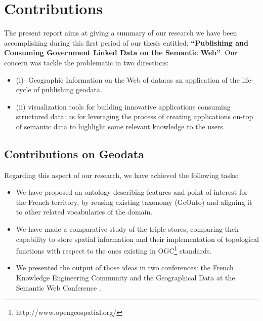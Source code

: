 \documentclass[a4paper,11pt]{report}
\begin{document}

\section{Contributions}
The present report aims at giving a summary of our research we have been accomplishing
during this first period of our thesis entitled: \textbf{``Publishing and Consuming Government Linked Data on the Semantic Web''}. Our concern was tackle the problematic in two directions: 
\begin{itemize}
\item (i)- Geographic Information on the Web of data:as an application of the life-cycle of publishing geodata.
\item (ii) visualization tools for building innovative applications consuming structured data: as for leveraging the process of creating applications on-top of semantic data to highlight some relevant knowledge to the users.

\end{itemize}

\subsection{Contributions on Geodata}
Regarding this aspect of our research, we have achieved the following tasks:
 \begin{itemize}
  \item We have proposed an ontology describing features and point of interest for the French territory, by reusing existing taxonomy (GeOnto) and aligning it to other related vocabularies of 
  the domain.
 \item We have made a comparative study of the triple stores, comparing their capability to store spatial information and their implementation of topological functions with respect to the ones 
existing in OGC\footnote{http://www.opengeospatial.org/} standards.
 \item We presented the output of those ideas in two conferences: the French Knowledge Engineering Community \cite{atemezing2012a} and the Geographical Data at the Semantic Web Conference \cite{atemezing2012b}.

\end{itemize}
\end{document}
